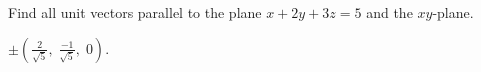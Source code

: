 
\begin{Exercise}[
name={},
title={}, 
difficulty=0,
origin={\cite{BS}}]
Find all unit vectors parallel to the plane $x + 2y + 3z = 5$ and the $xy$-plane.
\end{Exercise}
\begin{Answer}
$\pm \left(\frac{2}{\sqrt{5}},\;\frac{-1}{\sqrt{5}},\;0\right)$.

\end{Answer}
